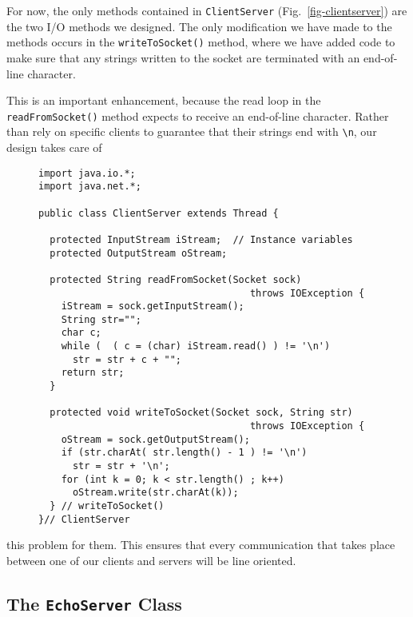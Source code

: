 {For now, the only methods contained in {\tt ClientServer}
(Fig.~\ref{fig-clientserver}) are the two I/O methods we designed.
The only modification we have made to the methods occurs in
the {\tt writeToSocket()} method, where we have added code to make
sure that any strings written to the socket are terminated with an
end-of-line character.

This is an important enhancement, because the read loop in the
{\tt read\-From\-Socket()} method expects to receive an end-of-line
character.  Rather than rely on specific clients to
guarantee that their strings end with \verb|\n|, our design takes care of
\begin{figure}[h]
\jjjprogstart
\begin{jjjlisting}
\begin{lstlisting}
import java.io.*;
import java.net.*;

public class ClientServer extends Thread {

  protected InputStream iStream;  // Instance variables
  protected OutputStream oStream;

  protected String readFromSocket(Socket sock) 
                                     throws IOException {
    iStream = sock.getInputStream();
    String str="";
    char c;
    while (  ( c = (char) iStream.read() ) != '\n')
      str = str + c + "";
    return str;
  }

  protected void writeToSocket(Socket sock, String str) 
                                     throws IOException {
    oStream = sock.getOutputStream();
    if (str.charAt( str.length() - 1 ) != '\n')
      str = str + '\n';
    for (int k = 0; k < str.length() ; k++)
      oStream.write(str.charAt(k));
  } // writeToSocket()
}// ClientServer
\end{lstlisting}
\end{jjjlisting}
\end{figure}
this problem for them.   This ensures that every communication that
takes place between one of our clients and servers will be
line oriented.


\subsection{The {\tt EchoServer} Class}

}
